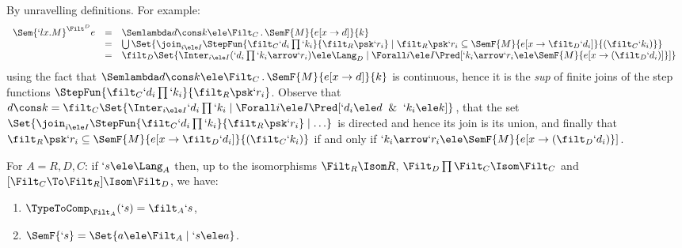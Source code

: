 \documentclass{CSML}
\begin{document}
 \begin{Proof}
By unravelling definitions. For example:
%
%
 \[ \begin{array}[t]{rcl@{\quad}l}
\Sem{ `l x.M}^{\Filt^D }{ e }
	& = & \Semlambda d\cons k \ele \Filt_C \, . \, \SemF { M }{ e[x\to d] }{ k } \\
	& = & \bigcup \Set{ \join_{i \ele I}\StepFun{\filt_C `d_i\prod `k_i }{ \filt_R\psk `r_i} \mid \filt_R\psk `r_i \subseteq \SemF { M }{ e[x\to \filt_D `d_i] }{ (\filt_C `k_i) } } \\
	& = & \filt_D \Set{ \Inter_{i \ele I}(`d_i\prod `k_i\arrow `r_i) \ele \Lang_D \mid \Forall i \ele I \Pred[{ `k_i\arrow `r_i \ele \SemF { M }{ e[x\to (\filt_D `d_i)] } }] }
	\end{array} \]
using the fact that $ \Semlambda d\cons k \ele \Filt_C \, . \, \SemF { M }{ e[x\to d] }{ k }$ is continuous, hence it is the \emph{sup} of finite joins of the step functions 
$\StepFun{\filt_C `d_i\prod `k_i }{ \filt_R\psk `r_i} $.
Observe that $d\cons k = \filt_C \Set{\Inter_{i \ele I}`d_i\prod `k_i \mid \Forall i \ele I \Pred[ `d_i \ele d \And `k_i \ele k ] }$, that the set $\Set{\join_{i \ele I}\StepFun{\filt_C `d_i\prod `k_i }{ \filt_R\psk `r_i} \mid \ldots}$ is directed and hence its join is its union, and finally that $\filt_R\psk `r_i \subseteq \SemF { M }{ e[x\to \filt_D `d_i] }{ (\filt_C `k_i) }$ if and only if $`k_i\arrow `r_i \ele \SemF { M }{ e[x\to (\filt_D `d_i) } ]$.
 \end{Proof}

 \begin{lem} \label{lem:filtSemTypes}
For $A = R,D,C$: if $`s\ele \Lang_A$ then, up to the isomorphisms $\Filt_R\Isom R$, $\Filt_D\prod\Filt_C \Isom \Filt_C$ and
$[\Filt_C\To\Filt_R]\Isom \Filt_D$,
we have:
 \begin{enumerate}
 \item \label{lem:filtSemTypes-1}
	$\TypeToComp_{\Filt_A}(`s) = \filt_A `s$,
 \item \label{lem:filtSemTypes-2}
	$\SemF {`s} = \Set{a \ele \Filt_A \mid `s \ele a}$.
 \end{enumerate}
 \end{lem}
\end{document}
